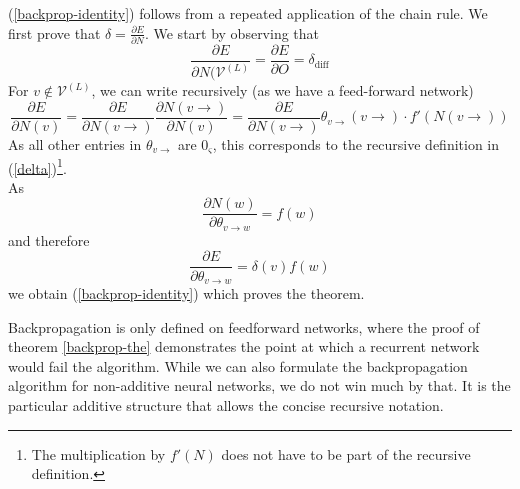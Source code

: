 \documentclass[a4paper,11pt]{article}
\newcommand{\const}{\varsigma}
\begin{document}
\begin{Bew}
(\ref{backprop-identity}) follows from a repeated application of the chain rule. We first prove that $\delta=\frac{\partial E}{\partial N}$. We start by observing that
\begin{equation}
\frac{\partial E}{\partial N(\mathcal{V}^{(L)}}=\frac{\partial E}{\partial O}=\delta_{\text{diff}}
\end{equation}
For $v\notin\mathcal{V}^{(L)}$, we can write recursively (as we have a feed-forward network)
\begin{equation}
\frac{\partial E}{\partial N(v)}=\frac{\partial E}{\partial N(v\to)}\frac{\partial N(v\to)}{\partial N(v)}=\frac{\partial E}{\partial N(v\to)}\theta_{v\to}(v\to)\cdot f'(N(v\to))
\end{equation}
As all other entries in $\theta_{v\to}$ are $0_{\const}$, this corresponds to the recursive definition in (\ref{delta})\footnote{The multiplication by $f'(N)$ does not have to be part of the recursive definition.}.\\
As
\begin{equation}
\frac{\partial N(w)}{\partial\theta_{v\to w}}=f(w)
\end{equation}
and therefore
\begin{equation}
\frac{\partial E}{\partial\theta_{v\to w}}=\delta(v)f(w)
\end{equation}
we obtain (\ref{backprop-identity}) which proves the theorem.
\end{Bew}
\begin{Bem}
Backpropagation is only defined on feedforward networks, where the proof of theorem \ref{backprop-the} demonstrates the point at which a recurrent network would fail the algorithm. While we can also formulate the backpropagation algorithm for non-additive neural networks, we do not win much by that. It is the particular additive structure that allows the concise recursive notation.
\end{Bem}
\end{document}
